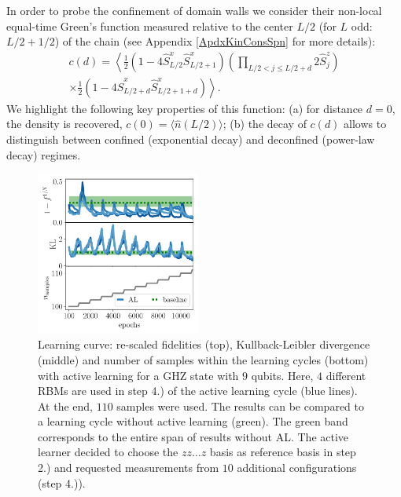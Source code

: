 \documentclass[pra,aps,showpacs,groupedaddress,superscriptaddress,twocolumn,toc=flat,biblatex,footinbib]{revtex4-1}
\renewcommand{\l}{\left(}
\renewcommand{\r}{\right)}
\begin{document}
In order to probe the confinement of domain walls we consider their non-local equal-time Green's function measured relative to the center $L/2$ (for $L$ odd: $L/2+1/2$) of the chain (see Appendix \ref{ApdxKinConsSpn} for more details):
\begin{multline}
    c(d) = \left \langle
    \frac{1}{2} \l 1 - 4\hat{S}^{x}_{L/2}\hat{S}^{x}_{L/2+1} \r \l \prod_{L/2 < j \leq L/2+d}
    2 \hat{S}^{z}_{j} \r  \right. \\
   \times \left. \frac{1}{2} \l 1- 4\hat{S}^{x}_{L/2+d}\hat{S}^{x}_{L/2+1+d} \r
    \right \rangle .
    \label{eq:GreensSpinDef}
\end{multline}
We highlight the following key properties of this function: (a) for distance $d=0$, the density is recovered, $c(0) = \langle \hat{n}(L/2) \rangle$; (b) the decay of $c(d)$ allows to distinguish between confined (exponential decay) and deconfined (power-law decay) regimes.




\begin{figure}[t]
	\centering
  \includegraphics[width=0.48\textwidth]{Paper/Graphics/LearningCurve.pdf}
	\caption[Learning curve with active learning]{Learning curve: re-scaled fidelities (top), Kullback-Leibler divergence (middle) and number of samples within the learning cycles (bottom) with active learning for a GHZ state with $9$ qubits. Here, $4$ different RBMs are used in step 4.) of the active learning cycle (blue lines). At the end, $110$ samples were used. The results can be compared to a learning cycle without active learning (green). The green band corresponds to the entire span of results without AL. The active learner decided to choose the $zz\dots z$ basis as reference basis in step 2.) and requested measurements from $10$ additional configurations (step 4.)).}
	\label{fig:ALLearningCurve}
\end{figure}
\end{document}
